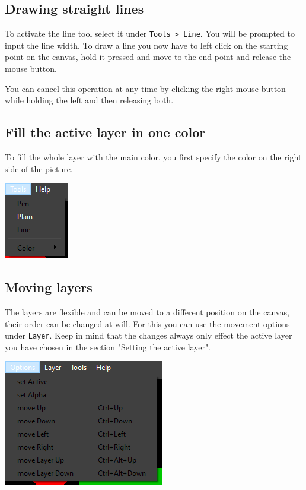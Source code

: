 \documentclass[a4paper, 12pt]{article}
\begin{document}
\subsection{Drawing straight lines}
To activate the line tool select it under \texttt{Tools > Line}. You will be prompted to input the line width.
To draw a line you now have to left click on the starting point on the canvas, hold it pressed and move to the end point and release the mouse button.

You can cancel this operation at any time by clicking the right mouse button while holding the left and then releasing both.

\subsection{Fill the active layer in one color}
To fill the whole layer with the main color, you first specify the color on the right side of the picture.

\begin{center}
\includegraphics[width=0.3\linewidth,keepaspectratio]{assets/tool-plain}
\end{center}

\subsection{Moving layers}
The layers are flexible and can be moved to a different position on the canvas, their order can be changed at will. For this you can use the movement options under \texttt{Layer}. Keep in mind that the changes always only effect the active layer you have chosen in the section "Setting the active layer".

\begin{center}
\includegraphics[width=0.3\linewidth,keepaspectratio]{assets/layer-options}
\end{center}
\end{document}
